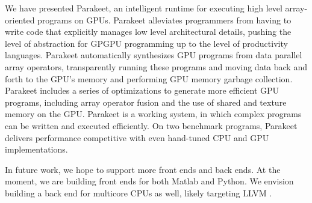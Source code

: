 \documentclass[preprint]{sigplanconf}
\begin{document}
We have presented Parakeet, an intelligent runtime for executing high level
array-oriented programs on GPUs.  Parakeet alleviates programmers from having
to write code that explicitly manages low level architectural details, pushing
the level of abstraction for GPGPU programming up to the level of productivity
languages.  Parakeet automatically synthesizes GPU programs from data parallel
array operators, transparently running these programs and moving data back and
forth to the GPU's memory and performing GPU memory garbage collection.
Parakeet includes a series of optimizations to generate more efficient GPU
programs, including array operator fusion and the use of shared and texture
memory on the GPU.  Parakeet is a working system, in which complex programs can
be written and executed efficiently.  On two benchmark programs, Parakeet
delivers performance competitive with even hand-tuned CPU and GPU
implementations.

In future work, we hope to support more front ends and back ends.  At the
moment, we are building front ends for both Matlab and Python.  We envision
building a back end for multicore CPUs as well, likely targeting LLVM
\cite{Latt02}.


{}
\end{document}
